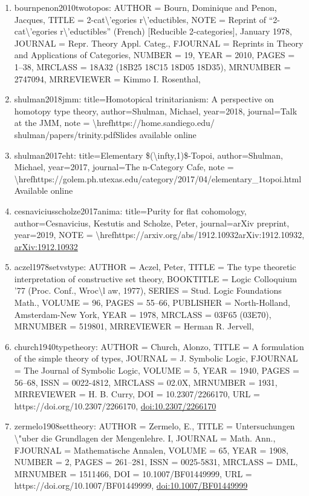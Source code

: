 \documentclass[11pt]{article}
\begin{document}
\begin{enumerate}[leftmargin=*]
  \item bournpenon2010twotopos: AUTHOR = Bourn, Dominique and Penon, Jacques, TITLE = 2-cat\textbackslash{}'egories r\textbackslash{}'eductibles, NOTE = Reprint of ``2-cat\textbackslash{}'egories r\textbackslash{}'eductibles'' (French) [Reducible 2-categories], January 1978, JOURNAL = Repr. Theory Appl. Categ., FJOURNAL = Reprints in Theory and Applications of Categories, NUMBER = 19, YEAR = 2010, PAGES = 1--38, MRCLASS = 18A32 (18B25 18C15 18D05 18D35), MRNUMBER = 2747094, MRREVIEWER = Kimmo I. Rosenthal,
  \item shulman2018jmm: title=Homotopical trinitarianism: A perspective on homotopy type theory, author=Shulman, Michael, year=2018, journal=Talk at the JMM, note = \textbackslash{}hrefhttps://home.sandiego.edu/ shulman/papers/trinity.pdfSlides available online
  \item shulman2017eht: title=Elementary \$(\textbackslash{}infty,1)\$-Topoi, author=Shulman, Michael, year=2017, journal=The n-Category Cafe, note = \textbackslash{}hrefhttps://golem.ph.utexas.edu/category/2017/04/elementary\_1topoi.htmlAvailable online
  \item cesnaviciusscholze2017anima: title=Purity for flat cohomology, author=Cesnavicius, Kestutis and Scholze, Peter, journal=arXiv preprint, year=2019, NOTE = \textbackslash{}hrefhttps://arxiv.org/abs/1912.10932arXiv:1912.10932, \href{https://arxiv.org/abs/1912.10932}{arXiv:1912.10932}
  \item aczel1978setvstype: AUTHOR = Aczel, Peter, TITLE = The type theoretic interpretation of constructive set theory, BOOKTITLE = Logic Colloquium '77 (Proc. Conf., Wroc\textbackslash{}l aw, 1977), SERIES = Stud. Logic Foundations Math., VOLUME = 96, PAGES = 55--66, PUBLISHER = North-Holland, Amsterdam-New York, YEAR = 1978, MRCLASS = 03F65 (03E70), MRNUMBER = 519801, MRREVIEWER = Herman R. Jervell,
  \item church1940typetheory: AUTHOR = Church, Alonzo, TITLE = A formulation of the simple theory of types, JOURNAL = J. Symbolic Logic, FJOURNAL = The Journal of Symbolic Logic, VOLUME = 5, YEAR = 1940, PAGES = 56--68, ISSN = 0022-4812, MRCLASS = 02.0X, MRNUMBER = 1931, MRREVIEWER = H. B. Curry, DOI = 10.2307/2266170, URL = https://doi.org/10.2307/2266170, \href{https://doi.org/10.2307/2266170}{doi:10.2307/2266170}
  \item zermelo1908settheory: AUTHOR = Zermelo, E., TITLE = Untersuchungen \textbackslash{}"uber die Grundlagen der Mengenlehre. I, JOURNAL = Math. Ann., FJOURNAL = Mathematische Annalen, VOLUME = 65, YEAR = 1908, NUMBER = 2, PAGES = 261--281, ISSN = 0025-5831, MRCLASS = DML, MRNUMBER = 1511466, DOI = 10.1007/BF01449999, URL = https://doi.org/10.1007/BF01449999, \href{https://doi.org/10.1007/BF01449999}{doi:10.1007/BF01449999}

\end{enumerate}
\end{document}
